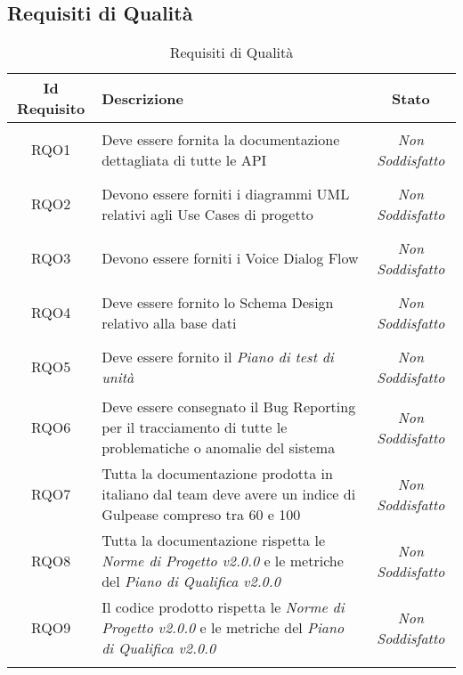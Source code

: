 \subsection{Requisiti di Qualità}
\normalsize
\begin{longtable}{|c|>{\centering}m{7cm}|c|}
	\hline 
	\textbf{Id Requisito} & \textbf{Descrizione} & \textbf{Stato}\\
	\hline
	\endhead
	\hypertarget{RQO1}{RQO1} & Deve essere fornita la documentazione dettagliata di tutte le API & \textit{Non Soddisfatto}\\ \hline
	
	\hypertarget{RQO2}{RQO2} & Devono essere forniti i diagrammi UML relativi agli Use Cases di progetto & \textit{Non Soddisfatto}\\ \hline
	
	\hypertarget{RQO3}{RQO3} & Devono essere forniti i Voice Dialog Flow & \textit{Non Soddisfatto}\\ \hline
	
	\hypertarget{RQO4}{RQO4} & Deve essere fornito lo Schema Design relativo alla base dati & \textit{Non Soddisfatto}\\ \hline
	
	\hypertarget{RQO5}{RQO5} & Deve essere fornito il \textit{Piano di test di unità} & \textit{Non Soddisfatto}\\ \hline
	
	\hypertarget{RQO6}{RQO6} & Deve essere consegnato il Bug Reporting per il tracciamento di tutte le problematiche o anomalie del sistema & \textit{Non Soddisfatto}\\ \hline
	
	\hypertarget{RQO7}{RQO7} & Tutta la documentazione prodotta in italiano dal team deve avere un indice di Gulpease compreso tra 60 e 100 & \textit{Non Soddisfatto}\\ \hline
	
	\hypertarget{RQO8}{RQO8} & Tutta la documentazione rispetta le \textit{Norme di Progetto v2.0.0} e le metriche del \textit{Piano di Qualifica v2.0.0} & \textit{Non Soddisfatto}\\ \hline
	
	\hypertarget{RQO9}{RQO9} & Il codice prodotto rispetta le \textit{Norme di Progetto v2.0.0} e le metriche del \textit{Piano di Qualifica v2.0.0} & \textit{Non Soddisfatto}\\ \hline
	
	\caption[Requisiti di Qualità]{Requisiti di Qualità}
	\label{tabella:req2}
\end{longtable}
\clearpage
